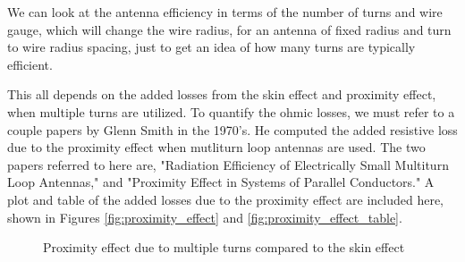 \documentclass[12pt,onecolumn,titlepage]{article}
\begin{document}
We can look at the antenna efficiency in terms of the number of turns and wire gauge, which will change the wire radius, for an antenna of fixed radius and turn to wire radius spacing, just to get an idea of how many turns are typically efficient.

This all depends on the added losses from the skin effect and proximity effect, when multiple turns are utilized. To quantify the ohmic losses, we must refer to a couple papers by Glenn Smith in the 1970's. He computed the added resistive loss due to the proximity effect when mutliturn loop antennas are used. The two papers referred to here are, "Radiation Efficiency of Electrically Small Multiturn Loop Antennas," and "Proximity Effect in Systems of Parallel Conductors." A plot and table of the added losses due to the proximity effect are included here, shown in Figures \ref{fig:proximity_effect} and \ref{fig:proximity_effect_table}.


\begin{figure}[htbp]
	\centering
		\quad
	\label{fig:prox_effect}
	\caption{Proximity effect due to multiple turns compared to the skin effect}
\end{figure}
\end{document}
